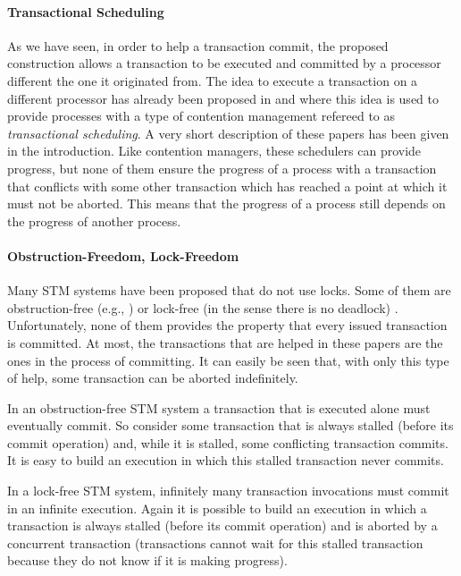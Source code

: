 \paragraph{Transactional Scheduling}  
As we have seen, in order to help a transaction commit,  
the proposed construction allows a transaction to be executed and committed
by a processor different  the one it originated from. 
The idea  to execute  a transaction on   a different processor  has already
been proposed  in \cite{ALKJKW09} and  \cite{AM09} where this idea is used
to   provide processes with  a   type  of
contention management refereed to as {\it transactional scheduling}. 
A very short description of these papers has been given in  the introduction.
Like  contention  managers, these  schedulers  can  provide
progress,  but  none of  them  ensure  the progress  of  a  process with  a
transaction that conflicts with some  other transaction which has reached a
point at which it  must not be aborted. This means that  the  progress of a
process still  depends on the progress  of another process. 


\paragraph{Obstruction-Freedom, Lock-Freedom} 
Many STM systems have been proposed that do not use locks.
Some of them  are obstruction-free  (e.g., \cite{HLMS03,ST97})
or lock-free  (in the sense there is no deadlock) \cite{GHS08}.
Unfortunately, none of them  provides the property that every issued 
transaction is committed. At most, the transactions that are helped 
in these papers are the ones in the process of committing.
It can easily be seen that, with only this type of help,  some transaction 
can be aborted indefinitely.

In an obstruction-free STM system a transaction that is executed alone 
must eventually commit. So consider some transaction that is always 
stalled (before its commit operation) and, while it is stalled, 
some conflicting transaction commits. It is easy to build an execution 
in which this stalled transaction never commits.

In a lock-free STM system, infinitely many transaction invocations must 
commit   in  an infinite  execution.  Again it  is  possible  to build   an
execution in which a transaction is always stalled  
(before its commit operation) and is aborted by a concurrent transaction  
(transactions cannot wait for this stalled transaction because they do not 
know if it is making progress).

